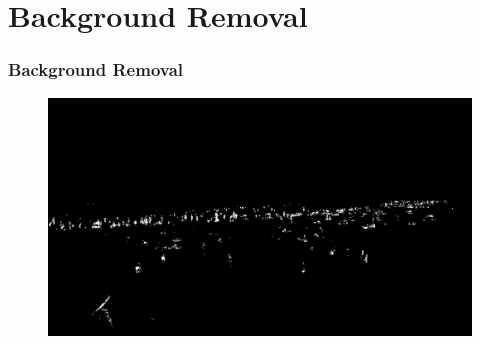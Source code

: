 \documentclass{beamer}
\begin{document}

\section{Background Removal}
    \begin{frame}
        \frametitle{Background Removal}
        \begin{figure}
            \centering
            \includegraphics[width=\textwidth]{../gen/bin/1660320000.jpg}
        \end{figure}
    \end{frame}
\end{document}
